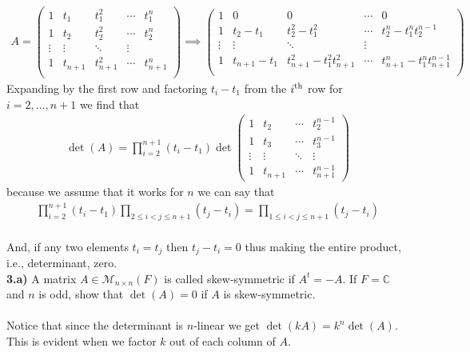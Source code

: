 \documentclass[11pt]{amsart}
\theoremstyle{definition}  %
\newcommand{\C}{\mathbb{C}}
\begin{document}
\begin{align*}
	A = \begin{pmatrix}
		1 & t_1 & t_1^2 & \cdots & t_1^n\\
		1 & t_2 & t_2^2 & \cdots & t_2^n\\
		\vdots & \vdots & \ddots & \vdots \\
		1 & t_{n+1} & t_{n+1}^2 & \cdots & t_{n+1}^n\\
	\end{pmatrix} \implies
	\begin{pmatrix}
		1 & 0 & 0 & \cdots & 0\\
		1 & t_2-t_1 & t_2^2-t_1^2 & \cdots & t_2^n-t_1^nt_2^{n-1}\\
		\vdots & \vdots & \ddots & \vdots \\
		1 & t_{n+1}-t_1 & t_{n+1}^2-t_1^2t_{n+1}^2 & \cdots & t_{n+1}^n-t_1^n t_{n+1}^{n-1}\\
	\end{pmatrix}
\end{align*}Expanding by the first row and factoring $t_i-t_1$ from the $i\textsuperscript{th}$ row for $i=2,\dots,n+1$ we find that
\begin{align*}
	\det(A) = \prod_{i=2}^{n+1}(t_i-t_1)\det\begin{pmatrix}
	1 & t_2 & \cdots & t_2^{n-1} \\
	1 & t_3 & \cdots & t_3^{n-1} \\
	\vdots & \vdots & \ddots & \vdots \\
	1 & t_{n+1} & \cdots & t_{n+1}^{n-1}
	\end{pmatrix}
\end{align*}because we assume that it works for $n$ we can say that
\begin{align*}
	\prod_{i=2}^{n+1}(t_i-t_1)\prod_{2\le i<j\le n+1} (t_j-t_i) = \prod_{1\le i<j\le n+1}(t_j-t_i)
\end{align*}\\
And, if any two elements $t_i=t_j$ then $t_j-t_i=0$ thus making the entire product, i.e., determinant, zero.
\\
\newpage
\vskip 0.1cm
\noindent
{\bf 3.a)}  A matrix $A \in \mathcal{M}_{n \times n}(F)$ is called
skew-symmetric if $A^t = -A$. If $F = \C$ and $n$ is odd, show that
$\det(A) = 0$ if $A$ is skew-symmetric. \\
\\
Notice that since the determinant is $n$-linear we get $\det(kA) = k^n\det(A)$.  This is evident when we factor $k$ out of each column of $A$.\\
\end{document}
